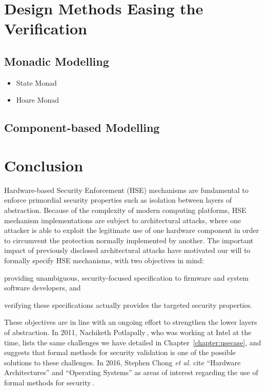 \section{Design Methods Easing the Verification}

\subsection{Monadic Modelling}

\begin{itemize}
\item State Monad
\item Hoare Monad
\end{itemize}

\subsection{Component-based Modelling}

\section{Conclusion}

\newpage

Hardware-based Security Enforcement (HSE) mechanisms are fundamental to enforce
primordial security properties such as isolation between layers of abstraction.
%
Because of the complexity of modern computing platforms, HSE mechanism
implementations are subject to architectural attacks, where one attacker is able
to exploit the legitimate use of one hardware component in order to circumvent
the protection normally implemented by another.
%
The important impact of previously disclosed architectural attacks have
motivated our will to formally specify HSE mechanisms, with two objectives in
mind:
%
\begin{inparaenum}[(1)]
\item providing unambiguous, security-focused specification to firmware and
  system software developers, and
%
\item verifying these specifications actually provides the targeted security
  properties.
\end{inparaenum}
%
These objectives are in line with an ongoing effort to strengthen the lower
layers of abstraction.
%
In 2011, Nachiketh Potlapally\,\cite{potlapally2011hardwaresecurity}, who was
working at Intel at the time, lists the same challenges we have detailed in
Chapter~\ref{chapter:usecase}, and suggests that formal methods for security
validation is one of the possible solutions to these challenges.
%
In 2016, Stephen Chong \emph{et al.} cite ``Hardware Architectures'' and
``Operating Systems'' as areas of interest regarding the use of formal methods
for security\,\cite{chong2016report}.

